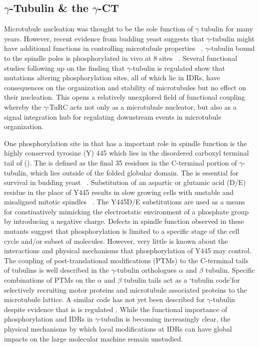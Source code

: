 \subsection{$\gamma$-Tubulin \& the $\gamma$-CT}

Microtubule nucleation was thought to be the sole function of $\gamma$ tubulin for many years. However, recent evidence from budding yeast suggests that $\gamma$-tubulin might have additional functions in controlling microtubule properties ~\cite{vogel2000carboxy,vogel2001phosphorylation, cuschieri2006gamma, nazarova2013cdk1}. $\gamma$-tubulin bound to the spindle poles is phosphorylated in vivo at  8 sites ~\cite{vogel2001phosphorylation,keck2011cell}.
Several functional studies following up on the finding that $\gamma$-tubulin is regulated show that mutations altering phosphorylation sites, all of which lie in IDRs, have consequences on the organization and stability of microtubules but no effect on their nucleation. This opens a relatively unexplored field of functional coupling whereby the $\gamma$-TuRC acts not only as a microtubule nucleator, but also as a signal integration hub for regulating downstream events in microtubule organization.

One phosphorylation site in \tub that has a important role in spindle function is the highly conserved  tyrosine  (Y)  445  which lies in the  disordered  carboxyl  terminal  tail  of \tub  (\gct). The \gct{} is defined as the final 35 residues in the C-terminal portion of $\gamma$-tubulin, which lies outside of the folded globular domain. The  \gct is essential for survival in budding yeast  ~\cite{vogel2000carboxy}. Substitution of an aspartic or glutamic acid (D/E) residue in the place of Y445 results  in slow growing cells with unstable  and misaligned mitotic  spindles ~\cite{vogel2001phosphorylation}. The Y445D/E substitutions are used as a means for constiuatively mimicking the electrostatic  environment  of a phosphate  group  by introducing  a negative  charge. Defects in spindle function observed in these mutants suggest that phosphorylation is limited to a specific stage of the cell cycle and/or subset of molecules. However, very little  is known about  the interactions and physical mechanisms that  phosphorylation  of  Y445 may control.   The  coupling of post-translational modifications  (PTMs) to the C-terminal  tails of tubulins  is well described in the $\gamma$-tubulin orthologues  $\alpha$ and $\beta$ tubulin.  Specific combinations  of PTMs  on the $\alpha$ and $\beta$ tubulin  tails act as a  \lq tubulin code\rq for selectively recruiting  motor  proteins  and  microtubule  associated  proteins to the microtubule  lattice.  A similar code has not yet been described for $\gamma$-tubulin despite evidence that  is is regulated \vivo.  While the functional importance  of phosphorylation and IDRs in $\gamma$-tubulin is becoming increasingly clear, the physical mechanisms  by which local modifications  at  IDRs can have global impacts  on the large molecular machine remain unstudied.


